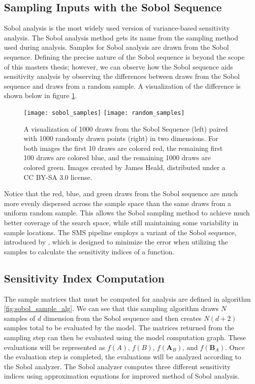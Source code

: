 \subsection{Sampling Inputs with the Sobol Sequence\label{sec:sobol_seq}}
Sobol analysis is the most widely used version of variance-based sensitivity analysis. The Sobol analysis method gets its name from the sampling method used during analysis. Samples for Sobol analysis are drawn from the Sobol sequence. Defining the precise nature of the Sobol sequence is beyond the scope of this masters thesis; however, we can observe how the Sobol sequence aids sensitivity analysis by observing the differences between draws from the Sobol sequence and draws from a random sample. A visualization of the difference is shown below in figure \ref{fig:sobol_seq_vis}.

\FloatBarrier
\begin{figure}[!htbp]
    \label{fig:sobol_seq_vis}
    \centering
    \texttt{[image: sobol\_samples]}\hfill
    \texttt{[image: random\_samples]}
    \caption[Sobol Sequence Visualization]{A visualization of 1000 draws from the Sobol Sequence (left) paired with 1000 randomly drawn points (right) in two dimensions. For both images the first 10 draws are colored red, the remaining first 100 draws are colored blue, and the remaining 1000 draws are colored green. Images created by James Heald, distributed under a CC BY-SA 3.0 license.}
\end{figure}
\FloatBarrier

Notice that the red, blue, and green draws from the Sobol sequence are much more evenly dispersed across the sample space than the same draws from a uniform random sample. This allows the Sobol sampling method to achieve much better coverage of the search space, while still maintaining some variability in sample locations. The SMS pipeline employs a variant of the Sobol sequence, introduced by \citet{saltelli2002ImprovedSobolSeq}, which is designed to minimize the error when utilizing the samples to calculate the sensitivity indices of a function.

\subsection{Sensitivity Index Computation\label{sec:si_comp}}
The sample matrices that must be computed for analysis are defined in algorithm \ref{fig:sobol_sample_alg}. We can see that this sampling algorithm draws $N$ samples of $d$ dimension from the Sobol sequence and then creates $N(d+2)$ samples total to be evaluated by the model. The matrices returned from the sampling step can then be evaluated using the model computation graph. These evaluations will be represented as $f(A) \text{, } f(B) \text{, } f(\textbf{A}_{B}) \text{, and } f(\textbf{B}_{A})$. Once the evaluation step is completed, the evaluations will be analyzed according to the Sobol analyzer. The Sobol analyzer computes three different sensitivity indices using approximation equations for \citet{saltelli2010varianceSA} improved method of Sobol analysis.

